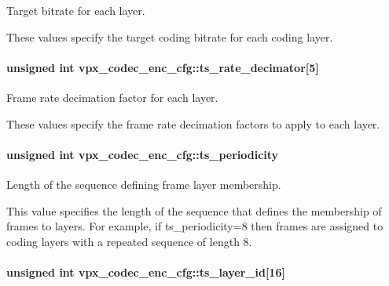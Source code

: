 Target bitrate for each layer. 

These values specify the target coding bitrate for each coding layer. \hypertarget{structvpx__codec__enc__cfg_ad40c30846ef8ef1d8684f10a491ec535}{
\paragraph[{ts\-\_\-rate\-\_\-decimator}]{\setlength{\rightskip}{0pt plus 5cm}unsigned int vpx\-\_\-codec\-\_\-enc\-\_\-cfg\-::ts\-\_\-rate\-\_\-decimator\mbox{[}5\mbox{]}}}\label{structvpx__codec__enc__cfg_ad40c30846ef8ef1d8684f10a491ec535}


Frame rate decimation factor for each layer. 

These values specify the frame rate decimation factors to apply to each layer. \hypertarget{structvpx__codec__enc__cfg_a4ec338780115dd270acf0dac24193474}{
\paragraph[{ts\-\_\-periodicity}]{\setlength{\rightskip}{0pt plus 5cm}unsigned int vpx\-\_\-codec\-\_\-enc\-\_\-cfg\-::ts\-\_\-periodicity}}\label{structvpx__codec__enc__cfg_a4ec338780115dd270acf0dac24193474}


Length of the sequence defining frame layer membership. 

This value specifies the length of the sequence that defines the membership of frames to layers. For example, if ts\-\_\-periodicity=8 then frames are assigned to coding layers with a repeated sequence of length 8. \hypertarget{structvpx__codec__enc__cfg_a4d105d2470dbfb7210b33d298f1cf1f6}{
\paragraph[{ts\-\_\-layer\-\_\-id}]{\setlength{\rightskip}{0pt plus 5cm}unsigned int vpx\-\_\-codec\-\_\-enc\-\_\-cfg\-::ts\-\_\-layer\-\_\-id\mbox{[}16\mbox{]}}}\label{structvpx__codec__enc__cfg_a4d105d2470dbfb7210b33d298f1cf1f6}



